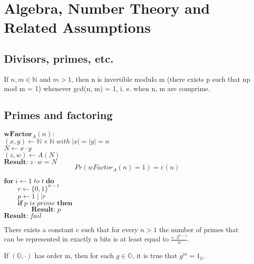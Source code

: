 \documentclass[../main]{subfiles}
\begin{document}
\chapter{Algebra, Number Theory and Related Assumptions}

\section{Divisors, primes, etc.}

\begin{lemma}
		If $n, m \in{} \mathbb{N}$ and $m > 1$, then n is invertible modulo m (there exists p such that np mod m = 1) whenever gcd(n, m) = 1, i. e. when n, m are comprime.
\end{lemma}

\section{Primes and factoring}

\noindent
$\textbf{wFactor}_A (n):$\\
$(x, y) \leftarrow{} \mathbb{N} \times{} \mathbb{N} \; with \; |x| = |y| = n$\\
$N \leftarrow{} x \cdot{} y$\\
$(z, w) \leftarrow{} A(N)$\\
$\textbf{Result:} \; z \cdot{} w = N$\\
$$Pr(wFactor_A (n) = 1) = \varepsilon{} (n)$$

\noindent
$\textbf{for} \; i \leftarrow{} 1 \; to \; t \; \textbf{do}$\\
$\quad{}\quad{}r \leftarrow{} \{0, 1\}^{n-1}$\\
$\quad{}\quad{}p \leftarrow{} 1\mid\mid r$\\
$\quad{}\quad{}\textbf{if} \; p \; is \; prime \; \textbf{then}$\\
$\quad{}\quad{}\quad{}\quad{}\textbf{Result:} \; p$\\
$\textbf{Result:} \; fail$\\

\begin{theorem}
	There exists a constant c such that for every $n > 1$ the number of primes that can be represented in exactly n bits is at least equal to $\frac{c \cdot{} 2^{n-1}}{n}$.
\end{theorem}

\begin{theorem}
	If $(\mathbb{G}, \cdot)$ has order m, then for each $g \in{} \mathbb{G}$, it is true that $g^m = 1_{\mathbb{G}}$.
\end{theorem}
\end{document}
